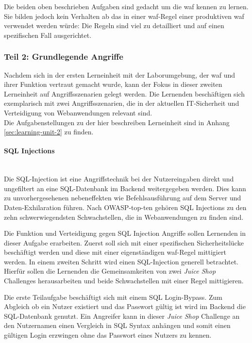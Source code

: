Die beiden oben beschrieben Aufgaben sind gedacht um die \ac{waf} kennen zu lernen.
Sie bilden jedoch kein Verhalten ab das in einer \ac{waf}-Regel einer produktiven \ac{waf} verwendet werden würde:
Die Regeln sind viel zu detailliert und auf einen spezifischen Fall ausgerichtet.

\subsubsection{Teil 2: Grundlegende Angriffe}
\label{sec:learning-unit-2-meta}

Nachdem sich in der ersten Lerneinheit mit der Laborumgebung, der \ac{waf} und ihrer Funktion vertraut gemacht wurde, kann der Fokus in dieser zweiten Lerneinheit auf Angriffsszenarien gelegt werden.
Die Lernenden beschäftigen sich exemplarisch mit zwei Angriffsszenarien, die in der aktuellen IT-Sicherheit und Verteidigung von Webanwendungen relevant sind.\\

Die Aufgabenstellungen zu der hier beschreiben Lerneinheit sind in Anhang \ref{sec:learning-unit-2} zu finden.

\paragraph{SQL Injections}\ \\
Die SQL-Injection ist eine Angriffstechnik bei der Nutzereingaben direkt und ungefiltert an eine SQL-Datenbank im Backend weitergegeben werden.
Dies kann zu unvorhergesehenen nebeneffekten wie Befehlsausführung auf dem Server und Daten-Exhilaration führen.
Nach OWASP-top-ten gehören SQL Injections zu den zehn schwerwiegendsten Schwachstellen, die in Webanwendungen zu finden sind.

Die Funktion und Verteidigung gegen SQL Injection Angriffe sollen Lernenden in dieser Aufgabe erarbeiten.
Zuerst soll sich mit einer spezifischen Sicherheitslücke beschäftigt werden und diese mit einer eigenständigen \ac{waf}-Regel mittigiert werden.
In einem zweiten Schritt wird einen SQL-Injection generell betrachtet.
Hierfür sollen die Lernenden die Gemeinsamkeiten von zwei \textit{Juice Shop} Challenges herausarbeiten und beide Schwachstellen mit einer Regel mittigieren.

Die erste Teilaufgabe beschäftigt sich mit einem SQL Login-Bypass.
Zum Abgleich ob ein Nutzer existiert und das Passwort gültig ist wird im Backend die SQL-Datenbank genutzt.
Ein Angreifer kann in dieser \textit{Juice Shop} Challenge an den Nutzernamen einen Vergleich in SQL Syntax anhängen und somit einen gültigen Login erzwingen ohne das Passwort eines Nutzers zu kennen.

